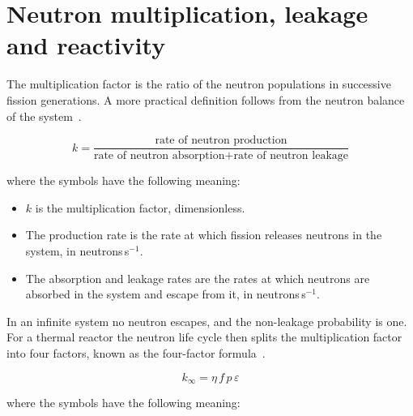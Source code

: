 \section{Neutron multiplication, leakage and reactivity}
\label{sec:bg-k}

The multiplication factor is the ratio of the neutron populations in
successive fission generations. A more practical definition follows from
the neutron balance of the system~\cite{duderstadt_hamilton_1976}.

\begin{equation}
k = \frac{\text{rate of neutron production}}
         {\text{rate of neutron absorption} + \text{rate of neutron leakage}}
\label{eq:k-balance}
\end{equation}

\noindent where the symbols have the following meaning:

\begin{itemize}
  \item $k$ is the multiplication factor, dimensionless.

  \item The production rate is the rate at which fission releases
        neutrons in the system, in neutrons\,s$^{-1}$.

  \item The absorption and leakage rates are the rates at which neutrons
        are absorbed in the system and escape from it, in
        neutrons\,s$^{-1}$.
\end{itemize}

In an infinite system no neutron escapes, and the non-leakage
probability is one. For a thermal reactor the neutron life cycle then
splits the multiplication factor into four factors, known as the
four-factor formula~\cite{duderstadt_hamilton_1976}.

\begin{equation}
k_\infty = \eta\, f\, p\, \varepsilon
\label{eq:kinf}
\end{equation}

\noindent where the symbols have the following meaning:

